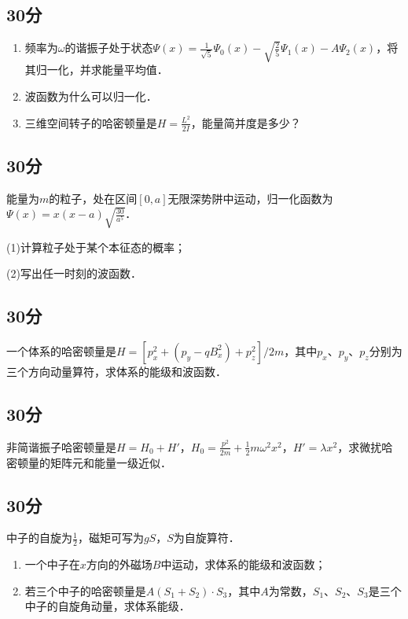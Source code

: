 
\subsection{30分}
\begin{enumerate}
\item 频率为$\omega$的谐振子处于状态$\varPsi (x)=\frac{1}{\sqrt{5}}\varPsi_{0} (x)-\sqrt{\frac{2}{5}}\varPsi_{1} (x)-A\varPsi_2 (x)$，将其归一化，并求能量平均值．
\item 波函数为什么可以归一化．
\item 三维空间转子的哈密顿量是$H=\frac{L^{2}}{2I}$，能量简并度是多少？
\end{enumerate}
\subsection{30分}
能量为$m$的粒子，处在区间$[0,a]$无限深势阱中运动，归一化函数为$\varPsi (x)=x(x-a)\sqrt{\frac{30}{a^{5}}}$．

(1)计算粒子处于某个本征态的概率；

(2)写出任一时刻的波函数．
\subsection{30分}
一个体系的哈密顿量是$H=[p^{2}_{x}+(p_{y}-qB_{x}^{2})+p^{2}_{z}]/2m$，其中$p_{x}$、$p_{y}$、$p_{z}$分别为三个方向动量算符，求体系的能级和波函数．
\subsection{30分}
非简谐振子哈密顿量是$H=H_{0}+H'$，$H_{0}=\frac{p^{2}}{2m}+\frac{1}{2}m\omega^{2}x^{2}$，$H'=\lambda x^{2}$，求微扰哈密顿量的矩阵元和能量一级近似．
\subsection{30分}
中子的自旋为$\frac{1}{2}$，磁矩可写为$gS$，$S$为自旋算符．
\begin{enumerate}
\item 一个中子在$x$方向的外磁场$B$中运动，求体系的能级和波函数；
\item 若三个中子的哈密顿量是$A(S_{1}+S_{2})\cdot S_{3}$，其中$A$为常数，$S_{1}$、$S_{2}$、$S_{3}$是三个中子的自旋角动量，求体系能级．
\end{enumerate}